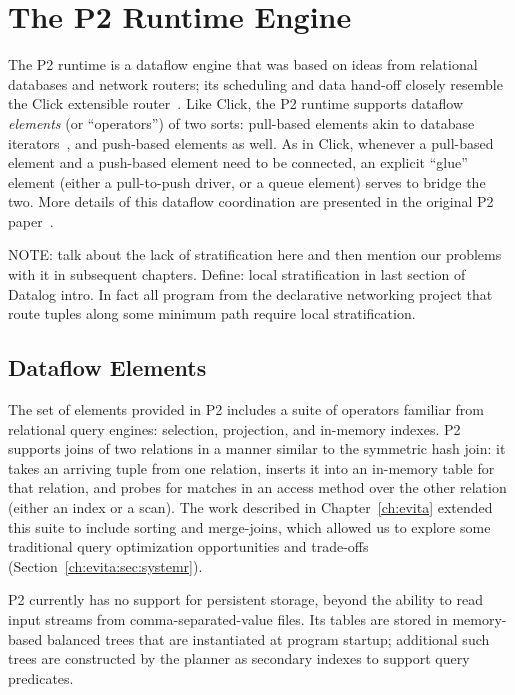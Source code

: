 \section{The P2 Runtime Engine}
\label{ch:p2:sec:p2}

The P2 runtime is a dataflow engine that was based on ideas from relational
databases and network routers; its scheduling and data hand-off closely
resemble the Click extensible router~\cite{click-tocs}.  Like Click, the P2
runtime supports dataflow {\em elements} (or ``operators'') of two sorts:
pull-based elements akin to database iterators~\cite{graefe-survey}, and
push-based elements as well.  As in Click, whenever a pull-based element and a
push-based element need to be connected, an explicit ``glue'' element (either a
pull-to-push driver, or a queue element) serves to bridge the two.  More
details of this dataflow coordination are presented in the original P2
paper~\cite{p2:sosp}.

NOTE: talk about the lack of stratification here and then mention our 
problems with it in subsequent chapters.
Define: local stratification in last section of Datalog intro.
In fact all program from the declarative networking project that route
tuples along some minimum path require local stratification.

\subsection{Dataflow Elements} 

The set of elements provided in P2 includes a suite of operators familiar from
relational query engines: selection, projection, and in-memory indexes.  P2
supports joins of two relations in a manner similar to the symmetric hash join:
it takes an arriving tuple from one relation, inserts it into an in-memory
table for that relation, and probes for matches in an access method over the
other relation (either an index or a scan).  The work described in
Chapter~\ref{ch:evita} extended this suite to include sorting and merge-joins,
which allowed us to explore some traditional query optimization opportunities
and trade-offs (Section~\ref{ch:evita:sec:systemr}).

P2 currently has no support for persistent storage, beyond the ability to read
input streams from comma-separated-value files.  Its tables are stored in
memory-based balanced trees that are instantiated at program startup;
additional such trees are constructed by the planner as secondary indexes to
support query predicates.

